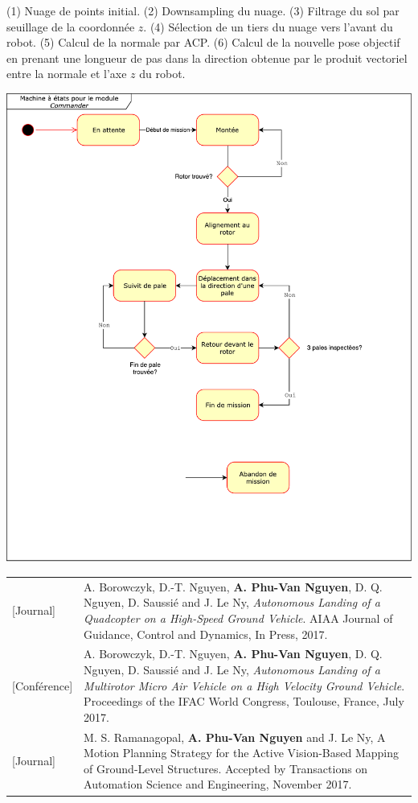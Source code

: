 (1) Nuage de points initial. (2) Downsampling du nuage. (3) Filtrage du sol par seuillage de la coordonnée $z$. (4) Sélection de un tiers du nuage vers l'avant du robot. (5) Calcul de la normale par ACP. (6) Calcul de la nouvelle pose objectif en prenant une longueur de pas dans la direction obtenue par le produit vectoriel entre la normale et l'axe $z$ du robot.

\includegraphics[width=\linewidth]{images/state_machine.pdf}
\label{annexe:state_machine}

\begin{longtable}{lp{5in}}
  [Journal]     & A. Borowczyk, D.-T. Nguyen, \textbf{A. Phu-Van Nguyen}, D. Q. Nguyen, D. Saussié and J. Le Ny, \textit{Autonomous Landing of a Quadcopter on a High-Speed Ground Vehicle}. AIAA Journal of Guidance, Control and Dynamics, In Press, 2017.\\

  [Conférence]  & A. Borowczyk, D.-T. Nguyen, \textbf{A. Phu-Van Nguyen}, D. Q. Nguyen, D. Saussié and J. Le Ny, \textit{Autonomous Landing of a Multirotor Micro Air Vehicle on a High Velocity Ground Vehicle}. Proceedings of the IFAC World Congress, Toulouse, France, July 2017.\\

  [Journal]      & M. S. Ramanagopal, \textbf{A. Phu-Van Nguyen} and J. Le Ny, A Motion Planning Strategy for the Active Vision-Based Mapping of Ground-Level Structures. Accepted by Transactions on Automation Science and Engineering, November 2017.
\end{longtable}

